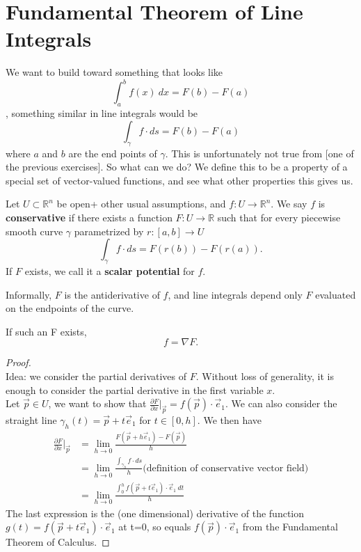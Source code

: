 \documentclass[11pt,openany]{book}
\newcommand{\definition}[2]{\begin{tcolorbox}[title=Definition ({#1}),colframe=black]{#2}\end{tcolorbox}
}
\newcommand{\proposition}[1]{\begin{tcolorbox}[title=Proposition,colframe=red!50!blue!20!white,colback=red!35!blue!10!white, coltitle=black]{#1}\end{tcolorbox}
}
\begin{document}
	\section*{Fundamental Theorem of Line Integrals}
	We want to build toward something that looks like 
	\[
		\int_{a}^{b} f(x) \ dx = F(b) - F(a)
	\], something similar in line integrals would be \[
		\int_\gamma f \cdot ds = F(b) - F(a)
	\] where $a$ and $b$ are the end points of $\gamma$. This is unfortunately not true from [one of the previous exercises]. So what can we do? We define this to be a property of a special set of vector-valued functions, and see what other properties this gives us.
	
	\definition{Conservative Vector Fields}{
		Let $U\subset\mathbb{R}^n$ be open+ other usual assumptions, and $f:U\to\mathbb{R}^n$. We say $f$ is \textbf{conservative} if there exists a function $F:U\to\mathbb{R}$ such that for every piecewise smooth curve $\gamma$ parametrized by $r: [a,b]\to U$
		\[
			\int_\gamma f \cdot ds = F(r(b)) - F(r(a)).
		\] 
		If $F$ exists, we call it a \textbf{scalar potential} for $f$.
	}
	Informally, $F$ is the antiderivative of $f$, and line integrals depend only $F$ evaluated on the endpoints of the curve.
	\proposition{
		If such an F exists, \[
			f = \nabla F.
		\]
	}
	\begin{proof} \ \\
		Idea: we consider the partial derivatives of $F$. Without loss of generality, it is enough to consider the partial derivative in the first variable $x$. \\
		Let $\vec{p} \in U$, we want to show that $\frac{\partial F}{\partial x} \big| _{\vec{p}} = f(\vec{p}) \cdot \vec{e}_1$. We can also consider the straight line $\gamma_h(t) = \vec{p} + t\vec{e}_1$ for $t\in[0,h]$. We then have \begin{align*}
			\frac{\partial F}{\partial x} \big| _{\vec{p}} &= \lim_{h\to 0} \frac{F(\vec{p}+h\vec{e}_1)-F(\vec{p})}{h} \\
			&= \lim_{h\to 0} \frac{\int_{\gamma_h} f \cdot ds}{h} \textrm{(definition of conservative vector field)}\\
			&= \lim_{h\to 0} \frac{\int_0^h f(\vec{p}+t\vec{e}_1) \cdot \vec{e}_1 \ dt}{h}
		\end{align*}
		The last expression is the (one dimensional) derivative of the function $g(t)=f(\vec{p}+t\vec{e}_1) \cdot \vec{e}_1$ at t=0, so equals $f(\vec{p})\cdot \vec{e}_1$ from the Fundamental Theorem of Calculus.
	\end{proof}
	
\end{document}
